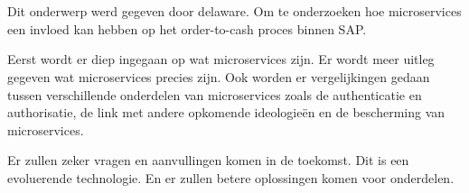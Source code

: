 
%
%

%



\chapter*{}


Dit onderwerp werd gegeven door delaware. Om te onderzoeken hoe microservices een invloed kan hebben op het order-to-cash proces binnen SAP. 

Eerst wordt er diep ingegaan op wat microservices zijn. Er wordt meer uitleg gegeven wat microservices precies zijn. Ook worden er vergelijkingen gedaan tussen verschillende onderdelen van microservices zoals de authenticatie en authorisatie, de link met andere opkomende ideologieën en de bescherming van microservices. 




Er zullen zeker vragen en aanvullingen komen in de toekomst. Dit is een evoluerende technologie. En er zullen betere oplossingen komen voor onderdelen.